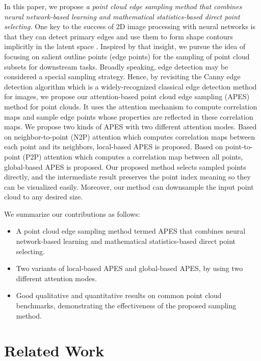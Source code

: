 \documentclass[10pt,twocolumn,letterpaper]{article}
\begin{document}
In this paper, we propose \emph{a point cloud edge sampling method that combines neural network-based learning and mathematical statistics-based direct point selecting.} 
One key to the success of 2D image processing with neural networks is that they can detect primary edges and use them to form shape contours implicitly in the latent space \cite{Yosinski2015UnderstandingNN}. Inspired by that insight, we pursue the idea of focusing on salient outline points (edge points) for the sampling of point cloud subsets for downstream tasks.
Broadly speaking, edge detection may be considered a special sampling strategy. 
Hence, by revisiting the Canny edge detection algorithm \cite{Canny1986ACA} which is a widely-recognized classical edge detection method for images, we propose our attention-based point cloud edge sampling (APES) method for point clouds. It uses the attention mechanism \cite{vaswani2017attention} to compute correlation maps and sample edge points whose properties are reflected in these correlation maps.
We propose two kinds of APES with two different attention modes. Based on neighbor-to-point (N2P) attention which computes correlation maps between each point and its neighbors, local-based APES is proposed. Based on point-to-point (P2P) attention which computes a correlation map between all points, global-based APES is proposed. 
Our proposed method selects sampled points directly, and the intermediate result preserves the point index meaning so they can be visualized easily. Moreover, our method can downsample the input point cloud to any desired size.

We summarize our contributions as follows:
\begin{itemize}[itemsep=-3pt,topsep=-5pt,left=3pt]
\item A point cloud edge sampling method termed APES that combines neural network-based learning and mathematical statistics-based direct point selecting. 
\item Two variants of local-based APES and global-based APES, by using two different attention modes.
\item Good qualitative and quantitative results on common point cloud benchmarks, demonstrating the effectiveness of the proposed sampling method.
\end{itemize}


\section{Related Work}
\label{sec:relatedWork}
\end{document}
